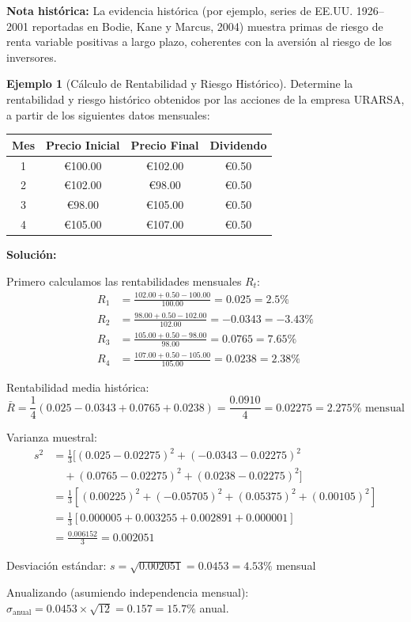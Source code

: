\documentclass[12pt,a4paper]{article}
\theoremstyle{definition}
\newtheorem{ejemplo}{Ejemplo}[section]
\begin{document}
\textbf{Nota histórica:} La evidencia histórica (por ejemplo, series de EE.UU. 1926--2001 reportadas en Bodie, Kane y Marcus, 2004) muestra primas de riesgo de renta variable positivas a largo plazo, coherentes con la aversión al riesgo de los inversores.

\begin{ejemplo}[Cálculo de Rentabilidad y Riesgo Histórico]
Determine la rentabilidad y riesgo histórico obtenidos por las acciones de la empresa URARSA, a partir de los siguientes datos mensuales:

\begin{center}
\begin{tabular}{cccc}
\toprule
Mes & Precio Inicial & Precio Final & Dividendo \\
\midrule
1 & €100.00 & €102.00 & €0.50 \\
2 & €102.00 & €98.00 & €0.50 \\
3 & €98.00 & €105.00 & €0.50 \\
4 & €105.00 & €107.00 & €0.50 \\
\bottomrule
\end{tabular}
\end{center}

\textbf{Solución:}

Primero calculamos las rentabilidades mensuales $R_t$:
\begin{align*}
R_1 &= \frac{102.00 + 0.50 - 100.00}{100.00} = 0.025 = 2.5\% \\
R_2 &= \frac{98.00 + 0.50 - 102.00}{102.00} = -0.0343 = -3.43\% \\
R_3 &= \frac{105.00 + 0.50 - 98.00}{98.00} = 0.0765 = 7.65\% \\
R_4 &= \frac{107.00 + 0.50 - 105.00}{105.00} = 0.0238 = 2.38\%
\end{align*}

Rentabilidad media histórica:
$$\bar{R} = \frac{1}{4}(0.025 - 0.0343 + 0.0765 + 0.0238) = \frac{0.0910}{4} = 0.02275 = 2.275\% \text{ mensual}$$

Varianza muestral:
\begin{align*}
s^2 &= \frac{1}{3}[(0.025 - 0.02275)^2 + (-0.0343 - 0.02275)^2 \\
&\quad + (0.0765 - 0.02275)^2 + (0.0238 - 0.02275)^2] \\
&= \frac{1}{3}[(0.00225)^2 + (-0.05705)^2 + (0.05375)^2 + (0.00105)^2] \\
&= \frac{1}{3}[0.000005 + 0.003255 + 0.002891 + 0.000001] \\
&= \frac{0.006152}{3} = 0.002051
\end{align*}

Desviación estándar: $s = \sqrt{0.002051} = 0.0453 = 4.53\%$ mensual

Anualizando (asumiendo independencia mensual): $\sigma_{\text{anual}} = 0.0453 \times \sqrt{12} = 0.157 = 15.7\%$ anual.
\end{ejemplo}
\end{document}
